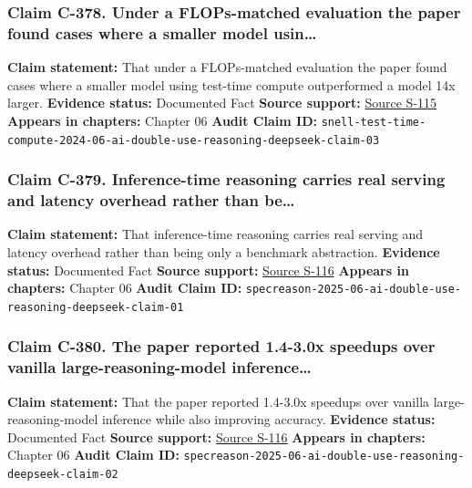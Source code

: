 \documentclass[
  american,
  11pt,
  letterpaper,
]{article}
\begin{document}
\subsubsection{Claim C-378. Under a FLOPs-matched evaluation the paper
found cases where a smaller model
usin\ldots{}}\label{claim-c-378-under-a-flops-matched-evaluation-the-paper-found-cases-where-a-smaller-model-usin}

\textbf{Claim statement:} That under a FLOPs-matched evaluation the
paper found cases where a smaller model using test-time compute
outperformed a model 14x larger. \textbf{Evidence status:} Documented
Fact \textbf{Source support:}
\hyperref[source-s-115-scaling-llm-test-time-compute-optimally-can-be-more-effective-than-scaling-model-parameters]{Source
S-115} \textbf{Appears in chapters:} Chapter 06 \textbf{Audit Claim ID:}
\texttt{snell-test-time-compute-2024-06-ai-double-use-reasoning-deepseek-claim-03}

\subsubsection{Claim C-379. Inference-time reasoning carries real
serving and latency overhead rather than
be\ldots{}}\label{claim-c-379-inference-time-reasoning-carries-real-serving-and-latency-overhead-rather-than-be}

\textbf{Claim statement:} That inference-time reasoning carries real
serving and latency overhead rather than being only a benchmark
abstraction. \textbf{Evidence status:} Documented Fact \textbf{Source
support:}
\hyperref[source-s-116-specreason-fast-and-accurate-inference-time-compute-via-speculative-reasoning]{Source
S-116} \textbf{Appears in chapters:} Chapter 06 \textbf{Audit Claim ID:}
\texttt{specreason-2025-06-ai-double-use-reasoning-deepseek-claim-01}

\subsubsection{Claim C-380. The paper reported 1.4-3.0x speedups over
vanilla large-reasoning-model
inference\ldots{}}\label{claim-c-380-the-paper-reported-1-4-3-0x-speedups-over-vanilla-large-reasoning-model-inference}

\textbf{Claim statement:} That the paper reported 1.4-3.0x speedups over
vanilla large-reasoning-model inference while also improving accuracy.
\textbf{Evidence status:} Documented Fact \textbf{Source support:}
\hyperref[source-s-116-specreason-fast-and-accurate-inference-time-compute-via-speculative-reasoning]{Source
S-116} \textbf{Appears in chapters:} Chapter 06 \textbf{Audit Claim ID:}
\texttt{specreason-2025-06-ai-double-use-reasoning-deepseek-claim-02}
\end{document}
